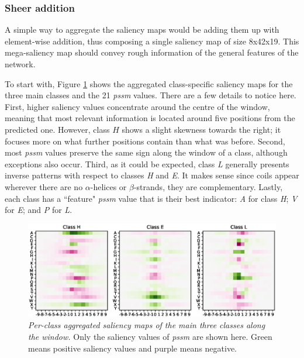 \subsubsection*{Sheer addition} \label{sect:sheer}
A simple way to aggregate the saliency maps would be adding them up with element-wise addition, thus composing a single saliency map of size 8x42x19. This mega-saliency map should convey rough information of the general features of the network.

To start with, Figure \ref{fig:class_agg_class} shows the aggregated class-specific saliency maps for the three main classes and the 21 \textit{pssm} values. There are a few details to notice here. First, higher saliency values concentrate around the centre of the window, meaning that most relevant information is located around five positions from the predicted one. However, class $H$ shows a slight skewness towards the right; it focuses more on what further positions contain than what was before. Second, most \textit{pssm} values preserve the same sign along the window of a class, although exceptions also occur. Third, as it could be expected, class \textit{L} generally presents inverse patterns with respect to classes \textit{H} and \textit{E}. It makes sense since coils appear wherever there are no $\alpha$-helices or $\beta$-strands, they are complementary. Lastly, each class has a ``feature" \textit{pssm} value that is their best indicator: \textit{A} for class \textit{H}; \textit{V} for \textit{E}; and \textit{P} for \textit{L}.

\begin{figure}
	\centering
	\includegraphics[width=1\linewidth]{Figures/class_agg_class}
	\caption{\textit{Per-class aggregated saliency maps of the main three classes along the window.} Only the saliency values of \textit{pssm} are shown here. Green means positive saliency values and purple means negative.}
	\label{fig:class_agg_class}
\end{figure}

